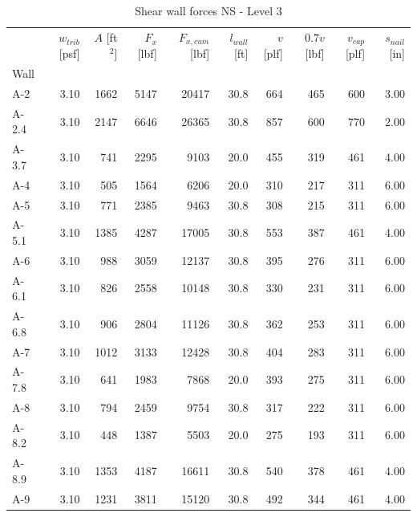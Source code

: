 \documentclass[11pt]{article}
\begin{document}
    
    \begin{table}[H]
\centering
\caption{Shear wall forces NS - Level 3}
\label{tab:shear_wall_forces_level3_ns}
\begin{tabular}{lrrrrrrrrr}
\toprule
 & $w_{trib}$ [psf] & $A$ [ft$^2$] & $F_x$ [lbf] & $F_{x,cum}$ [lbf] & $l_{wall}$ [ft] & $v$ [plf] & $0.7 v$ [lbf] & $v_{cap}$ [plf] & $s_{nail}$ [in] \\
Wall &  &  &  &  &  &  &  &  &  \\
\midrule
A-2 & 3.10 & 1662 & 5147 & 20417 & 30.8 & 664 & 465 & 600 & 3.00 \\
A-2.4 & 3.10 & 2147 & 6646 & 26365 & 30.8 & 857 & 600 & 770 & 2.00 \\
A-3.7 & 3.10 & 741 & 2295 & 9103 & 20.0 & 455 & 319 & 461 & 4.00 \\
A-4 & 3.10 & 505 & 1564 & 6206 & 20.0 & 310 & 217 & 311 & 6.00 \\
A-5 & 3.10 & 771 & 2385 & 9463 & 30.8 & 308 & 215 & 311 & 6.00 \\
A-5.1 & 3.10 & 1385 & 4287 & 17005 & 30.8 & 553 & 387 & 461 & 4.00 \\
A-6 & 3.10 & 988 & 3059 & 12137 & 30.8 & 395 & 276 & 311 & 6.00 \\
A-6.1 & 3.10 & 826 & 2558 & 10148 & 30.8 & 330 & 231 & 311 & 6.00 \\
A-6.8 & 3.10 & 906 & 2804 & 11126 & 30.8 & 362 & 253 & 311 & 6.00 \\
A-7 & 3.10 & 1012 & 3133 & 12428 & 30.8 & 404 & 283 & 311 & 6.00 \\
A-7.8 & 3.10 & 641 & 1983 & 7868 & 20.0 & 393 & 275 & 311 & 6.00 \\
A-8 & 3.10 & 794 & 2459 & 9754 & 30.8 & 317 & 222 & 311 & 6.00 \\
A-8.2 & 3.10 & 448 & 1387 & 5503 & 20.0 & 275 & 193 & 311 & 6.00 \\
A-8.9 & 3.10 & 1353 & 4187 & 16611 & 30.8 & 540 & 378 & 461 & 4.00 \\
A-9 & 3.10 & 1231 & 3811 & 15120 & 30.8 & 492 & 344 & 461 & 4.00 \\
\bottomrule
\end{tabular}
\end{table}
\end{document}
